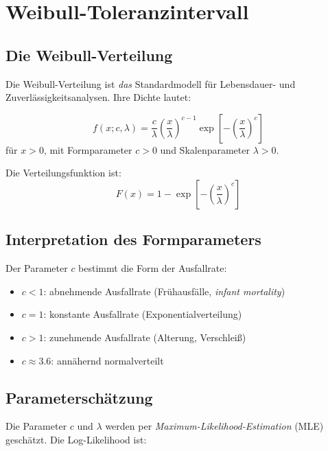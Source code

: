 \documentclass[10pt,a4paper,twocolumn]{article}
\theoremstyle{definition}
\begin{document}
\section{Weibull-Toleranzintervall}
\label{sec:weibull}

\subsection{Die Weibull-Verteilung}

Die Weibull-Verteilung ist \emph{das} Standardmodell für Lebensdauer-
und Zuverlässigkeitsanalysen. Ihre Dichte lautet:

\begin{equation}
    f(x; c, \lambda) = \frac{c}{\lambda}
    \left(\frac{x}{\lambda}\right)^{c-1}
    \exp\!\left[-\left(\frac{x}{\lambda}\right)^c\right]
    \label{eq:weibull_pdf}
\end{equation}
für $x > 0$, mit Formparameter $c > 0$ und Skalenparameter $\lambda > 0$.

Die Verteilungsfunktion ist:
\begin{equation}
    F(x) = 1 - \exp\!\left[-\left(\frac{x}{\lambda}\right)^c\right]
    \label{eq:weibull_cdf}
\end{equation}

\subsection{Interpretation des Formparameters}

Der Parameter $c$ bestimmt die Form der Ausfallrate:
\begin{itemize}[nosep,leftmargin=*]
    \item $c < 1$: abnehmende Ausfallrate (Frühausfälle, \emph{infant mortality})
    \item $c = 1$: konstante Ausfallrate (Exponentialverteilung)
    \item $c > 1$: zunehmende Ausfallrate (Alterung, Verschleiß)
    \item $c \approx 3.6$: annähernd normalverteilt
\end{itemize}

\subsection{Parameterschätzung}

Die Parameter $c$ und $\lambda$ werden per
\emph{Maximum-Likelihood-Estimation} (MLE) geschätzt.
Die Log-Likelihood ist:
\end{document}

